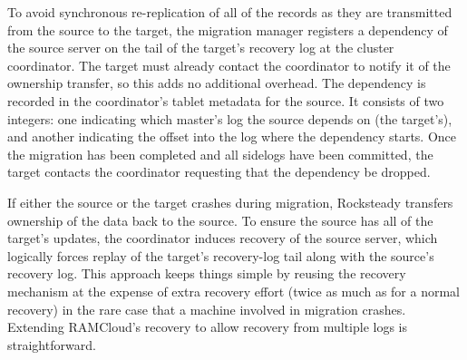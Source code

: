 To avoid synchronous re-replication of all of the records as they are
transmitted from the source to the target, the migration manager
registers a dependency of the source server on the tail of the target's
recovery log at the cluster coordinator. The target must already contact the
coordinator to notify it of the ownership transfer, so this adds no additional
overhead.  The dependency is recorded in the coordinator's tablet metadata for
the source. It consists of two integers: one indicating which
master's log the source depends on (the target's), and another indicating the offset
into the log where the dependency starts. Once the migration has been completed
and all sidelogs have been committed, the target contacts the
coordinator requesting that the dependency be dropped.

If either the source or the target crashes during migration, Rocksteady
transfers ownership of the data back to the source.  To ensure the source has
all of the target's updates, the coordinator induces recovery of the source
server, which logically forces replay of the target's recovery-log tail along
with the source's recovery log. This approach keeps things simple by reusing
the recovery mechanism at the expense of extra recovery effort (twice as much
as for a normal recovery) in the rare case that a machine involved in
migration crashes.
%
Extending RAMCloud's recovery to allow recovery from multiple logs is
straightforward.

